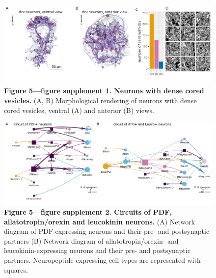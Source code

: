 \documentclass[
  11pt,
]{article}
\begin{document}
\begin{figure}[H]

{\centering \includegraphics[width=1\textwidth,height=\textheight]{Figures/Figure5_fig_suppl1.png}

}

\caption{\textbf{Figure 5---figure supplement 1. Neurons with dense
cored vesicles.} (A, B) Morphological rendering of neurons with dense
cored vesicles, ventral (A) and anterior (B) views.}

\end{figure}%

\begin{figure}[H]

{\centering \includegraphics[width=1\textwidth,height=\textheight]{Figures/Figure5_fig_suppl2.png}

}

\caption{\textbf{Figure 5---figure supplement 2. Circuits of PDF,
allatotropin/orexin and leucokinin neurons. } (A) Network diagram of
PDF-expressing neurons and their pre- and postsynaptic partners (B)
Network diagram of allatotropin/orexin- and leucokinin-expressing
neurons and their pre- and postsynaptic partners.
Neuropeptide-expressing cell types are represented with squares.}

\end{figure}%
\end{document}

